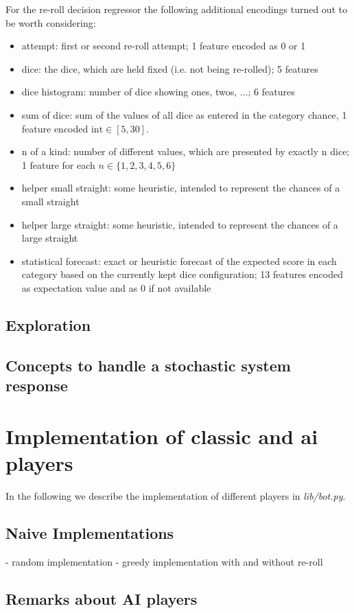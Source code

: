 \documentclass{article}
\begin{document}
For the re-roll decision regressor the following additional encodings turned out to be worth considering:
\begin{itemize}
\item attempt: first or second re-roll attempt; 1 feature encoded as 0 or 1
\item dice: the dice, which are held fixed (i.e. not being re-rolled); 5 features
\item dice histogram: number of dice showing ones, twos, ...; 6 features
\item sum of dice: sum of the values of all dice as entered in the category chance, 1 feature encoded $\mathrm{int} \in [5,30]$.
\item n of a kind: number of different values, which are presented by exactly n dice; 1 feature for each $n \in \{1,2,3,4,5,6\}$
\item helper small straight: some heuristic, intended to represent the chances of a small straight
\item helper large straight: some heuristic, intended to represent the chances of a large straight
\item statistical forecast: exact or heuristic forecast of the expected score in each category
      based on the currently kept dice configuration; 13 features encoded as expectation value and as 0 if not available
\end{itemize}

\subsection{Exploration}
\subsection{Concepts to handle a stochastic system response}

\section{Implementation of classic and ai players}
\label{sec_players}
In the following we describe the implementation of different players in \emph{lib/bot.py}.

\subsection{Naive Implementations}
- random implementation
- greedy implementation with and without re-roll

\subsection{Remarks about AI players}
\end{document}
